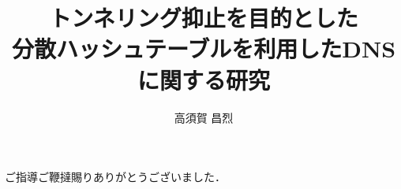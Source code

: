 \documentclass[12pt]{jarticle} %
\title{トンネリング抑止を目的とした\\分散ハッシュテーブルを利用したDNSに関する研究}
\author{高須賀 昌烈}
\begin{document}
\titlepage
\cmemberspage
\firstabstract
\secondabstract



\toc
\newpage
\listoffigures
\listoftables



\newpage
{}











\newpage
\acknowledgements
ご指導ご鞭撻賜りありがとうございました．
\end{document}
